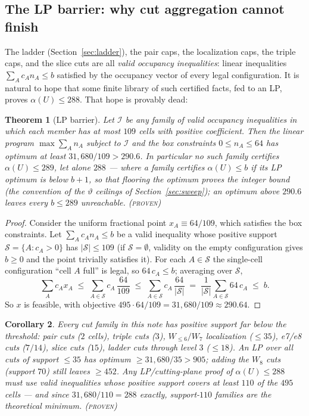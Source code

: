 \documentclass[11pt]{article}
\newtheorem{theorem}{Theorem}
\newtheorem{corollary}[theorem]{Corollary}
\theoremstyle{remark}
\begin{document}
\subsection{The LP barrier: why cut aggregation cannot finish}

The ladder (Section~\ref{sec:ladder}), the pair caps, the localization
caps, the triple caps, and the slice cuts are all \emph{valid occupancy
inequalities}: linear inequalities $\sum_A c_A n_A\le b$ satisfied by the
occupancy vector of every legal configuration. It is natural to hope that
some finite library of such certified facts, fed to an LP, proves
$\alpha(U)\le 288$. That hope is provably dead:

\begin{theorem}[LP barrier]\label{thm:barrier}
Let $\mathcal I$ be \emph{any} family of valid occupancy inequalities in
which each member has at most $109$ cells with positive coefficient. Then
the linear program $\max\sum_A n_A$ subject to $\mathcal I$ and the box
constraints $0\le n_A\le 64$ has optimum at least
$31{,}680/109>290.6$. In particular no such family certifies
$\alpha(U)\le 289$, let alone $288$ --- where a family \emph{certifies}
$\alpha(U)\le b$ if its LP optimum is below $b+1$, so that flooring the
optimum proves the integer bound (the convention of the $\vartheta$
ceilings of Section~\ref{sec:sweep}); an optimum above $290.6$ leaves
every $b\le 289$ unreachable. \textsc{(proven)}
\end{theorem}

\begin{proof}
Consider the uniform fractional point $x_A\equiv 64/109$, which satisfies
the box constraints. Let $\sum_A c_A n_A\le b$ be a valid inequality whose
positive support $\mathcal S=\{A:c_A>0\}$ has $|\mathcal S|\le109$ (if
$\mathcal S=\emptyset$, validity on the empty configuration gives $b\ge0$
and the point trivially satisfies it). For each $A\in\mathcal S$ the
single-cell configuration ``cell $A$ full'' is legal, so $64\,c_A\le b$;
averaging over $\mathcal S$,
\[
\sum_A c_A x_A\;\le\;\sum_{A\in\mathcal S}c_A\,\frac{64}{109}
\;\le\;\sum_{A\in\mathcal S}c_A\,\frac{64}{|\mathcal S|}
\;=\;\frac1{|\mathcal S|}\sum_{A\in\mathcal S}64\,c_A\;\le\;b .
\]
So $x$ is feasible, with objective $495\cdot64/109=31{,}680/109\approx
290.64$.
\end{proof}

\begin{corollary}\label{cor:barriercuts}
Every cut family in this note has positive support far below the
threshold: pair cuts ($2$ cells), triple cuts ($3$), $W_{\le6}/W_7$
localization ($\le35$), e7/e8 cuts ($7/14$), slice cuts ($15$), ladder
cuts through level $3$ ($\le18$). An LP over all cuts of support $\le35$
has optimum $\ge 31{,}680/35>905$; adding the $W_8$ cuts (support $70$)
still leaves $\ge452$. Any LP/cutting-plane proof of $\alpha(U)\le288$
must use valid inequalities whose positive support covers at least $110$
of the $495$ cells --- and since $31{,}680/110=288$ exactly, support-$110$
families are the theoretical minimum. \textsc{(proven)}
\end{corollary}
\end{document}
